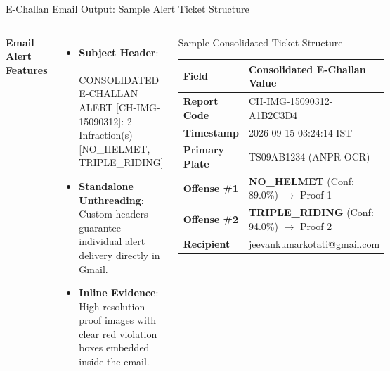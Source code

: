 \documentclass[10pt, compress, aspectratio=169]{beamer}
\begin{document}
\begin{frame}{E-Challan Email Output: Sample Alert Ticket Structure}
    \begin{columns}[c]
        \textbf{\textcolor{BTPPrimary}{Email Alert Features}}
        \vspace{2mm}
        \begin{itemize}\small
            \item \textbf{Subject Header}: \textsf{🚨 CONSOLIDATED E-CHALLAN ALERT [CH-IMG-15090312]: 2 Infraction(s) [NO\_HELMET, TRIPLE\_RIDING]}
            \item \textbf{Standalone Unthreading}: Custom headers guarantee individual alert delivery directly in Gmail.
            \item \textbf{Inline Evidence}: High-resolution proof images with clear red violation boxes embedded inside the email.
        \end{itemize}

        \begin{block}{Sample Consolidated Ticket Structure}
            \begin{center}\small
                \begin{tabularx}{\textwidth}{lX}
                    \rowcolor{BTPPrimary!15}
                    \textbf{Field} & \textbf{Consolidated E-Challan Value} \\
                    \hline
                    \textbf{Report Code} & \textsf{CH-IMG-15090312-A1B2C3D4} \\
                    \textbf{Timestamp} & \textsf{2026-09-15 03:24:14 IST} \\
                    \textbf{Primary Plate} & \textsf{TS09AB1234} (ANPR OCR) \\
                    \textbf{Offense \#1} & \textcolor{BTPRed}{\textbf{NO\_HELMET}} (Conf: 89.0\%) $\rightarrow$ Proof 1 \\
                    \textbf{Offense \#2} & \textcolor{BTPRed}{\textbf{TRIPLE\_RIDING}} (Conf: 94.0\%) $\rightarrow$ Proof 2 \\
                    \textbf{Recipient} & \textsf{jeevankumarkotati@gmail.com} \\
                \end{tabularx}
            \end{center}
        \end{block}
    \end{columns}
\end{frame}
\end{document}

